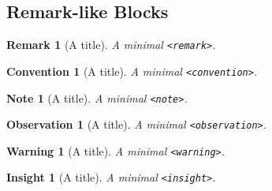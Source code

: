 \documentclass[pdflatex]{sn-jnl}
\theoremstyle{thmstyleone}%
\theoremstyle{thmstyletwo}%
\theoremstyle{thmstylethree}%
\newtheorem{remark}[theorem]{Remark}
\newtheorem{warning}[theorem]{Warning}
\newtheorem{convention}[theorem]{Convention}
\newtheorem{insight}[theorem]{Insight}
\newtheorem{note}[theorem]{Note}
\newtheorem{observation}[theorem]{Observation}
\newcommand{\mono}[1]{\texttt{#1}}
\numberwithin{equation}{section}
\begin{document}
\subsection{Remark-like Blocks}\label{block-samples-remark-like}%
\begin{remark}[A title]\label{block-samples-remark-like-2}%
%
A minimal \mono{<remark>}.%
\end{remark}
\begin{convention}[A title]\label{block-samples-remark-like-3}%
%
A minimal \mono{<convention>}.%
\end{convention}
\begin{note}[A title]\label{block-samples-remark-like-4}%
%
A minimal \mono{<note>}.%
\end{note}
\begin{observation}[A title]\label{block-samples-remark-like-5}%
%
A minimal \mono{<observation>}.%
\end{observation}
\begin{warning}[A title]\label{block-samples-remark-like-6}%
%
A minimal \mono{<warning>}.%
\end{warning}
\begin{insight}[A title]\label{block-samples-remark-like-7}%
%
A minimal \mono{<insight>}.%
\end{insight}
%
%
\typeout{************************************************}
\typeout{************************************************}
%
\end{document}
